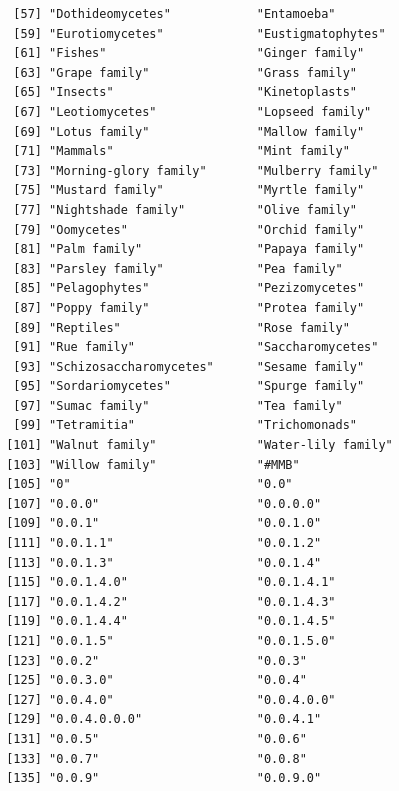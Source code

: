 \documentclass[
  letterpaper,
  DIV=11,
  numbers=noendperiod]{scrreprt}
\begin{document}
\begin{verbatim}
  [57] "Dothideomycetes"            "Entamoeba"                 
  [59] "Eurotiomycetes"             "Eustigmatophytes"          
  [61] "Fishes"                     "Ginger family"             
  [63] "Grape family"               "Grass family"              
  [65] "Insects"                    "Kinetoplasts"              
  [67] "Leotiomycetes"              "Lopseed family"            
  [69] "Lotus family"               "Mallow family"             
  [71] "Mammals"                    "Mint family"               
  [73] "Morning-glory family"       "Mulberry family"           
  [75] "Mustard family"             "Myrtle family"             
  [77] "Nightshade family"          "Olive family"              
  [79] "Oomycetes"                  "Orchid family"             
  [81] "Palm family"                "Papaya family"             
  [83] "Parsley family"             "Pea family"                
  [85] "Pelagophytes"               "Pezizomycetes"             
  [87] "Poppy family"               "Protea family"             
  [89] "Reptiles"                   "Rose family"               
  [91] "Rue family"                 "Saccharomycetes"           
  [93] "Schizosaccharomycetes"      "Sesame family"             
  [95] "Sordariomycetes"            "Spurge family"             
  [97] "Sumac family"               "Tea family"                
  [99] "Tetramitia"                 "Trichomonads"              
 [101] "Walnut family"              "Water-lily family"         
 [103] "Willow family"              "#MMB"                      
 [105] "0"                          "0.0"                       
 [107] "0.0.0"                      "0.0.0.0"                   
 [109] "0.0.1"                      "0.0.1.0"                   
 [111] "0.0.1.1"                    "0.0.1.2"                   
 [113] "0.0.1.3"                    "0.0.1.4"                   
 [115] "0.0.1.4.0"                  "0.0.1.4.1"                 
 [117] "0.0.1.4.2"                  "0.0.1.4.3"                 
 [119] "0.0.1.4.4"                  "0.0.1.4.5"                 
 [121] "0.0.1.5"                    "0.0.1.5.0"                 
 [123] "0.0.2"                      "0.0.3"                     
 [125] "0.0.3.0"                    "0.0.4"                     
 [127] "0.0.4.0"                    "0.0.4.0.0"                 
 [129] "0.0.4.0.0.0"                "0.0.4.1"                   
 [131] "0.0.5"                      "0.0.6"                     
 [133] "0.0.7"                      "0.0.8"                     
 [135] "0.0.9"                      "0.0.9.0"                   

\end{verbatim}
\end{document}

